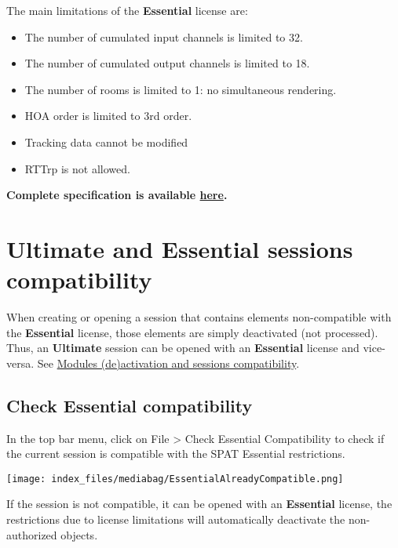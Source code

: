 \documentclass[
  letterpaper,
  DIV=11,
  numbers=noendperiod]{scrreport}
\providecommand{\tightlist}{%
  \setlength{\itemsep}{0pt}\setlength{\parskip}{0pt}}\usepackage{longtable,booktabs,array}
\begin{document}
The main limitations of the \textbf{Essential} license are:

\begin{itemize}
\tightlist
\item
  The number of cumulated input channels is limited to 32.
\item
  The number of cumulated output channels is limited to 18.
\item
  The number of rooms is limited to 1: no simultaneous rendering.
\item
  HOA order is limited to 3rd order.
\item
  Tracking data cannot be modified
\item
  RTTrp is not allowed.
\end{itemize}

\textbf{Complete specification is available
\href{https://www.flux.audio/project/spat-revolution/\#specifications}{here}.}

\hypertarget{ultimate-and-essential-sessions-compatibility}{%
\section{Ultimate and Essential sessions
compatibility}\label{ultimate-and-essential-sessions-compatibility}}

When creating or opening a session that contains elements non-compatible
with the \textbf{Essential} license, those elements are simply
deactivated (not processed). Thus, an \textbf{Ultimate} session can be
opened with an \textbf{Essential} license and vice-versa. See
\href{Spat_Environment_Modules_de_activation.md}{Modules (de)activation
and sessions compatibility}.

\hypertarget{check-essential-compatibility}{%
\subsection{Check Essential
compatibility}\label{check-essential-compatibility}}

In the top bar menu, click on File \textgreater{} Check Essential
Compatibility to check if the current session is compatible with the
SPAT Essential restrictions.

\texttt{[image: index\_files/mediabag/EssentialAlreadyCompatible.png]}

If the session is not compatible, it can be opened with an
\textbf{Essential} license, the restrictions due to license limitations
will automatically deactivate the non-authorized objects.
\end{document}
